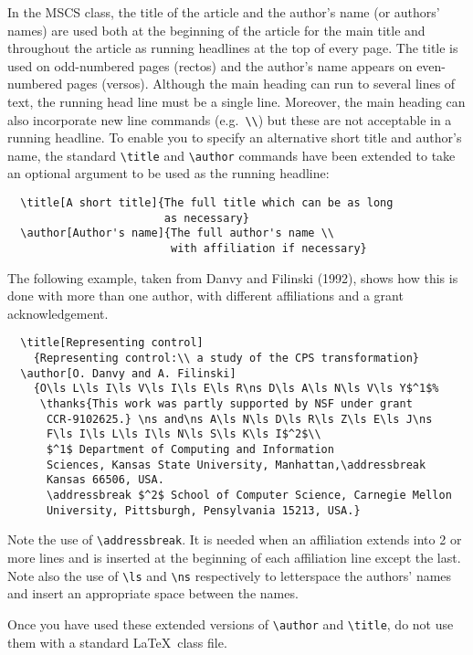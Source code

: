 \documentclass{mscs}
\begin{document}
In the MSCS class, the title of the article and the author's name (or
authors' names) are used both at the beginning of the article for the
main title and throughout the article as running headlines at the top of
every page. The title is used on odd-numbered pages (rectos) and the
author's name appears on even-numbered pages (versos).
Although the main heading can run to several lines of text, the running
head line must be a single line.
Moreover, the main heading can also incorporate new line commands
(e.g.\ \verb"\\") but these are not acceptable in a running headline.
To enable you to specify an alternative short title and author's name, the
standard \verb"\title" and \verb"\author" commands have been extended to
take an optional argument to be used as the running headline:
\begin{verbatim}
  \title[A short title]{The full title which can be as long
                        as necessary}
  \author[Author's name]{The full author's name \\
                         with affiliation if necessary}
\end{verbatim}

The following example, taken from Danvy and Filinski (1992), shows how
this is done with more than one author, with different affiliations
and a grant acknowledgement.
\begin{verbatim}
  \title[Representing control]
    {Representing control:\\ a study of the CPS transformation}
  \author[O. Danvy and A. Filinski]
    {O\ls L\ls I\ls V\ls I\ls E\ls R\ns D\ls A\ls N\ls V\ls Y$^1$%
     \thanks{This work was partly supported by NSF under grant
      CCR-9102625.} \ns and\ns A\ls N\ls D\ls R\ls Z\ls E\ls J\ns
      F\ls I\ls L\ls I\ls N\ls S\ls K\ls I$^2$\\
      $^1$ Department of Computing and Information
      Sciences, Kansas State University, Manhattan,\addressbreak
      Kansas 66506, USA.
      \addressbreak $^2$ School of Computer Science, Carnegie Mellon
      University, Pittsburgh, Pensylvania 15213, USA.}
\end{verbatim}
Note the use of \verb"\addressbreak". It is
needed when an affiliation extends into 2 or more lines and is inserted
at the beginning of each affiliation line except the last. Note also the
use of \verb"\ls" and \verb"\ns" respectively to letterspace the authors'
names and insert an appropriate space between the names.

Once you have used these extended versions of \verb"\author" and
\verb"\title", do not use them with a standard \LaTeX\ class file.
\end{document}
